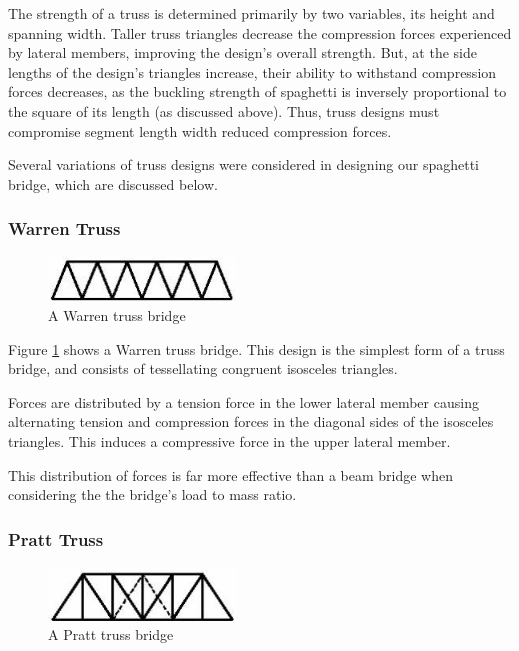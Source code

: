 \documentclass[a4paper,11pt]{article}
\begin{document}
The strength of a truss is determined primarily by two variables, its height and
spanning width.
Taller truss triangles decrease the compression forces experienced by lateral
members, improving the design's overall strength.
But, at the side lengths of the design's triangles increase, their ability to
withstand compression forces decreases, as the buckling strength of spaghetti is
inversely proportional to the square of its length (as discussed above).
Thus, truss designs must compromise segment length width reduced compression
forces.

Several variations of truss designs were considered in designing our spaghetti
bridge, which are discussed below.


\subsubsection{Warren Truss}

\begin{figure}
\begin{center}
\includegraphics[width=5cm]{figures/warren.png}
\end{center}
\caption{A Warren truss bridge}
\label{research:warren}
\end{figure}

Figure \ref{research:warren} shows a Warren truss bridge.
This design is the simplest form of a truss bridge, and consists of tessellating
congruent isosceles triangles.

Forces are distributed by a tension force in the lower lateral member causing
alternating tension and compression forces in the diagonal sides of the
isosceles triangles.
This induces a compressive force in the upper lateral member.

This distribution of forces is far more effective than a beam bridge when
considering the  the bridge's load to mass ratio.


\subsubsection{Pratt Truss}

\begin{figure}
\begin{center}
\includegraphics[width=5cm]{figures/pratt.png}
\end{center}
\caption{A Pratt truss bridge}
\label{research:pratt}
\end{figure}
\end{document}
